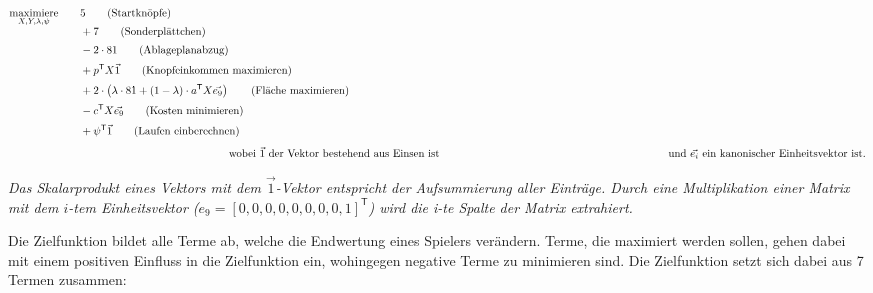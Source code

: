 \begin{align*}
    \smash{\displaystyle{\maximize_{X,Y,\lambda,\psi}}}\qquad & 5 \tag{\text{Startknöpfe}}                                                                                         \\[2pt]
                                                              & + 7 \tag{\text{Sonderplättchen}}                                                                                   \\[2pt]
                                                              & - 2 \cdot 81 \tag{\text{Ablageplanabzug}}                                                                          \\[2pt]
                                                              & + p^\mathsf{T}X\vec{1} \tag{\text{Knopfeinkommen maximieren}}                                                      \\[2pt]
                                                              & + 2 \cdot \left(\lambda\cdot 81 + (1 - \lambda) \cdot a^\mathsf{T}X\vec{e_9}\right) \tag{\text{Fläche maximieren}} \\[2pt]
                                                              & - c^\mathsf{T}X\vec{e_9} \tag{\text{Kosten minimieren}}                                                            \\[2pt]
                                                              & + \psi^\mathsf{T}\vec{1} \tag{\text{Laufen einberechnen}}                                                          \\[2pt]
    \intertext{\hspace{7cm} wobei $\vec{1}$ der Vektor bestehend aus Einsen ist \newline \hspace*{7.3cm} und $\vec{e_i}$ ein kanonischer Einheitsvektor ist.}
\end{align*}

\vspace*{-1cm}

\emph{Das Skalarprodukt eines Vektors mit dem $\vec{1}$-Vektor entspricht der Aufsummierung aller Einträge. Durch eine Multiplikation einer Matrix mit dem $i$-tem Einheitsvektor ($e_9 = \left[0,0,0,0,0,0,0,0,1\right]^\mathsf{T}$) wird die i-te Spalte der Matrix extrahiert.}

Die Zielfunktion bildet alle Terme ab, welche die Endwertung eines Spielers verändern. Terme, die maximiert werden sollen, gehen dabei mit einem positiven Einfluss in die Zielfunktion ein, wohingegen negative Terme zu minimieren sind. Die Zielfunktion setzt sich dabei aus 7 Termen zusammen:

